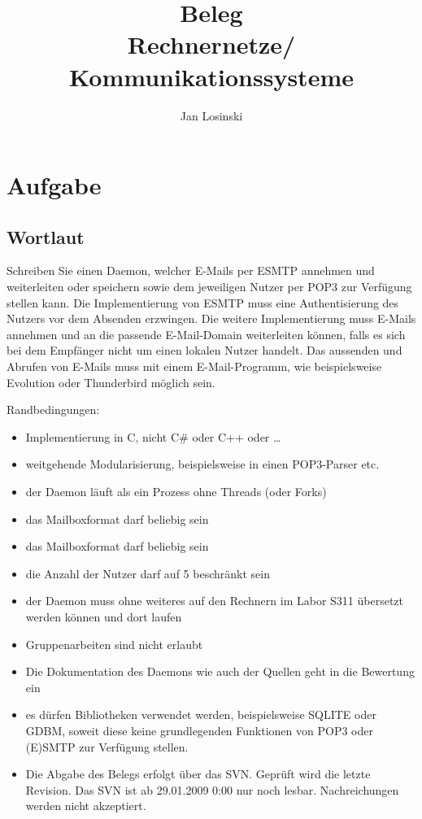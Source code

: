 \documentclass[final,a4paper,11pt,notitlepage,halfparskip]{scrreprt}
\title{Beleg\\
Rechnernetze/\\
Kommunikationssysteme}
\author{Jan Losinski}
\begin{document}
\maketitle

\tableofcontents

\chapter{Aufgabe}

\section{Wortlaut}\label{sec:aufgabe-wortlaut}
Schreiben Sie einen Daemon, welcher E-Mails per ESMTP annehmen und weiterleiten 
oder speichern sowie dem jeweiligen Nutzer per POP3 zur Verfügung stellen kann. 
Die Implementierung von ESMTP muss eine Authentisierung des Nutzers vor dem 
Absenden erzwingen. Die weitere Implementierung muss E-Mails annehmen und an die 
passende E-Mail-Domain weiterleiten können, falls es sich bei dem Empfänger 
nicht um einen lokalen Nutzer handelt. Das aussenden und Abrufen von E-Mails 
muss mit einem E-Mail-Programm, wie beispielsweise Evolution oder Thunderbird 
möglich sein.

Randbedingungen:
\begin{itemize}
  \item Implementierung in C, nicht C\# oder C++ oder \dots
  \item weitgehende Modularisierung, beispielsweise in einen POP3-Parser etc.
  \item der Daemon läuft als ein Prozess ohne Threads (oder Forks)
  \item das Mailboxformat darf beliebig sein
  \item das Mailboxformat darf beliebig sein
  \item die Anzahl der Nutzer darf auf 5 beschränkt sein
  \item der Daemon muss ohne weiteres auf den Rechnern im Labor S311 übersetzt 
        werden können und dort laufen
  \item Gruppenarbeiten sind nicht erlaubt
  \item Die Dokumentation des Daemons wie auch der Quellen geht in die Bewertung 
        ein
  \item es dürfen Bibliotheken verwendet werden, beispielsweise SQLITE oder 
        GDBM, soweit diese keine grundlegenden Funktionen von POP3 oder (E)SMTP 
	zur Verfügung stellen.
  \item Die Abgabe des Belegs erfolgt über das SVN. Geprüft wird die letzte 
        Revision. Das SVN ist ab 29.01.2009 0:00 nur noch lesbar. Nachreichungen 
	werden nicht akzeptiert.
\end{itemize}
\end{document}
